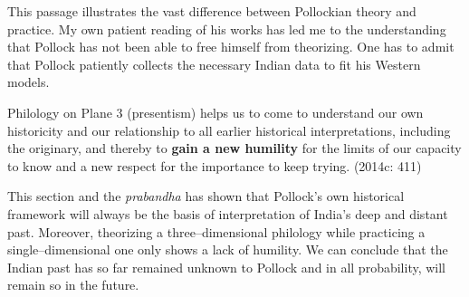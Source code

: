 This passage illustrates the vast difference between Pollockian theory and practice. My own patient reading of his works has led me to the understanding that Pollock has not been able to free himself from theorizing. One has to admit that Pollock patiently collects the necessary Indian data to fit his Western models.

\begin{myquote}
Philology on Plane 3 (presentism) helps us to come to understand our own historicity and our relationship to all earlier historical interpretations, including the originary, and thereby to \textbf{gain a new humility} for the limits of our capacity to know and a new respect for the importance to keep trying. (2014c: 411)
\end{myquote}

This section and the \textit{prabandha} has shown that Pollock’s own historical framework will always be the basis of interpretation of India’s deep and distant past. Moreover, theorizing a three–dimensional philology while practicing a single–dimensional one only shows a lack of humility. We can conclude that the Indian past has so far remained unknown to Pollock and in all probability, will remain so in the future.

